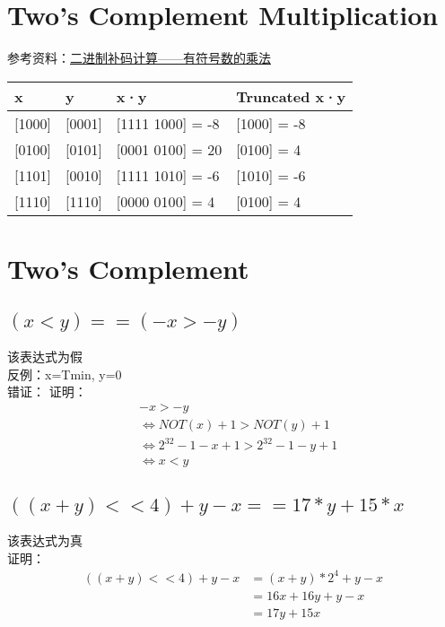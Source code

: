 \documentclass[12pt, a4paper, oneside]{ctexart}
\begin{document}
\section{Two's Complement Multiplication}

参考资料：\href{https://blog.csdn.net/qq_39873850/article/details/110119810}{二进制补码计算——有符号数的乘法}
\begin{table}[h]
    \centering
    \begin{tabular}{|l|l|l|l|}
    \hline
    x          & y          & x·y & Truncated x·y \\ \hline
    {[}1000{]} & {[}0001{]} & {[}1111 1000{]} = -8&{[}1000{]} = -8               \\ \hline
    {[}0100{]} & {[}0101{]} & {[}0001 0100{]} = 20&{[}0100{]} = 4               \\ \hline
    {[}1101{]} & {[}0010{]} & {[}1111 1010{]} = -6&{[}1010{]} = -6               \\ \hline
    {[}1110{]} & {[}1110{]} & {[}0000 0100{]} = 4&{[}0100{]} = 4             \\ \hline
    \end{tabular}
\end{table}

\section{Two's Complement}
\subsection{$(x<y)==(-x>-y)$}
\noindent
该表达式为假\\
反例：x=Tmin, y=0\\
错证：
证明：
\begin{equation}
    \begin{aligned}
    &     -x > -y \\
    &\Leftrightarrow NOT(x) + 1 > NOT(y) + 1 \\
    &\Leftrightarrow 2^{32} - 1 - x + 1 > 2^{32} - 1 - y + 1\\
    &\Leftrightarrow x < y    
    \end{aligned}
    \nonumber
\end{equation}
\subsection{ $((x + y) << 4) + y - x == 17 * y + 15 * x$}
\noindent
该表达式为真\\
证明：
\begin{equation}
    \begin{aligned}
        ((x + y) << 4) + y - x &= (x + y) * 2^4 + y - x\\
        &= 16x + 16y + y - x\\
        &= 17y + 15x
    \end{aligned}
    \nonumber
\end{equation}
\end{document}
